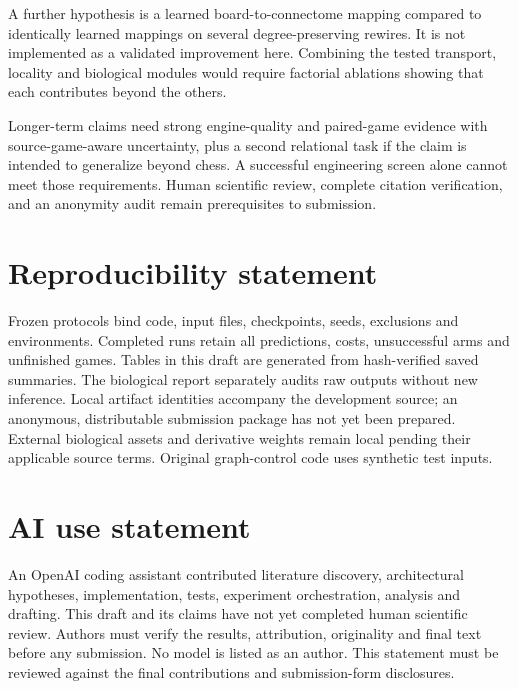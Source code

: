 \documentclass{article}
\begin{document}
A further hypothesis is a learned board-to-connectome mapping compared to
identically learned mappings on several degree-preserving rewires. It is not
implemented as a validated improvement here. Combining the tested transport,
locality and biological modules would require factorial ablations showing that
each contributes beyond the others.

Longer-term claims need strong engine-quality and paired-game evidence with
source-game-aware uncertainty, plus a second relational task if the claim is
intended to generalize beyond chess. A successful engineering screen alone
cannot meet those requirements. Human scientific review, complete citation
verification, and an anonymity audit remain prerequisites to submission.

\section*{Reproducibility statement}
Frozen protocols bind code, input files, checkpoints, seeds, exclusions and
environments. Completed runs retain all predictions, costs, unsuccessful arms
and unfinished games. Tables in this draft are generated from hash-verified
saved summaries. The biological report separately audits raw outputs without
new inference. Local artifact identities accompany the development source;
an anonymous, distributable submission package has not yet been prepared.
External biological assets and derivative weights remain local pending their
applicable source terms. Original graph-control code uses synthetic test inputs.

\section*{AI use statement}
An OpenAI coding assistant contributed literature discovery, architectural
hypotheses, implementation, tests, experiment orchestration, analysis and drafting.
This draft and its claims have not yet completed human scientific review. Authors
must verify the results, attribution, originality and final text before any
submission. No model is listed as an author. This statement must be reviewed
against the final contributions and submission-form disclosures.
\end{document}
